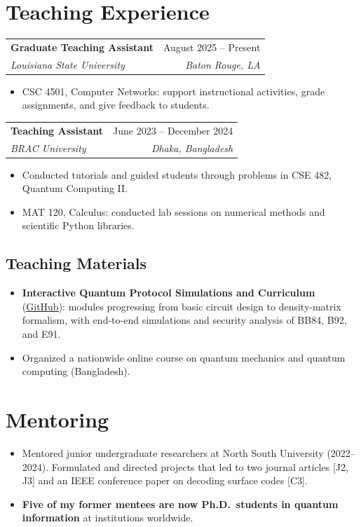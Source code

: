 \documentclass[letterpaper,11pt]{article}
\makeatletter
\newcommand{\cvlink}[2]{\href{#1}{\underline{#2}}}
\newcommand{\cventry}[4]{%
  \begin{tabularx}{\textwidth}{@{}X r@{}}
    \textbf{#1} & #2 \\
    \textit{#3} & \textit{#4}
  \end{tabularx}\par\vspace{1pt}}
\newenvironment{cvblock}
  {\par\noindent\begin{minipage}[t]{\textwidth}\raggedright}
  {\end{minipage}\par\vspace{5pt}}
\makeatother
\begin{document}
\section{Teaching Experience}

\begin{cvblock}
\cventry{Graduate Teaching Assistant}{August 2025 -- Present}
        {Louisiana State University}{Baton Rouge, LA}
\begin{itemize}
  \item CSC 4501, Computer Networks: support instructional activities, grade assignments, and give feedback to students.
\end{itemize}
\end{cvblock}

\begin{cvblock}
\cventry{Teaching Assistant}{June 2023 -- December 2024}
        {BRAC University}{Dhaka, Bangladesh}
\begin{itemize}
  \item Conducted tutorials and guided students through problems in CSE 482, Quantum Computing II.
  \item MAT 120, Calculus: conducted lab sessions on numerical methods and scientific Python libraries.
\end{itemize}
\end{cvblock}

\subsection{Teaching Materials}
\begin{itemize}
  \item \textbf{Interactive Quantum Protocol Simulations and Curriculum} \,(\cvlink{https://github.com/syedshubha/TeachingQuantumComputing}{GitHub}): modules progressing from basic circuit design to density-matrix formalism, with end-to-end simulations and security analysis of BB84, B92, and E91.
  \item Organized a nationwide online course on quantum mechanics and quantum computing (Bangladesh).
\end{itemize}

\section{Mentoring}
\begin{itemize}
  \item Mentored junior undergraduate researchers at North South University (2022--2024). Formulated and directed projects that led to two journal articles [J2, J3] and an IEEE conference paper on decoding surface codes [C3].
  \item \textbf{Five of my former mentees are now Ph.D.\ students in quantum information} at institutions worldwide.
\end{itemize}
\end{document}
